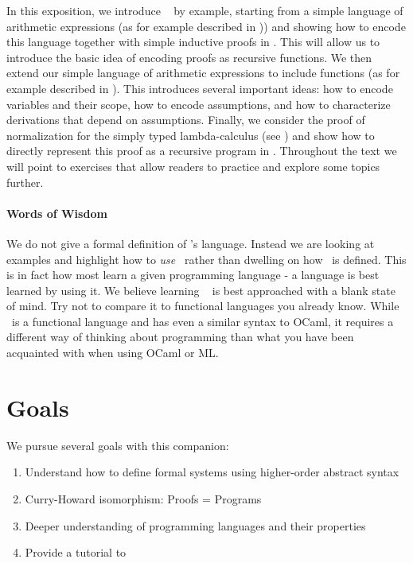 In this exposition, we introduce \beluga~ by example, starting from a simple language of arithmetic expressions (as for example described in \cite[Ch 3, Ch 8]{TAPL})) and showing how to encode this language together with simple inductive proofs  in \beluga. This will allow us to introduce the basic idea of encoding proofs as recursive functions. We then extend our simple language of arithmetic expressions to include functions (as for example described in \cite[Ch 5, Ch 9]{TAPL}). This introduces several important ideas: how to encode variables and their scope, how to encode assumptions, and how to characterize derivations that depend on assumptions. Finally, we consider the proof of normalization for the simply typed lambda-calculus (see \cite[Ch 12]{TAPL}) and show how to directly represent this proof as a recursive program in \beluga. Throughout the text we will point to exercises that allow readers to practice and explore some topics further.

\paragraph{Words of Wisdom}
We do not give a formal definition of \beluga's language.  Instead  we are looking at examples and highlight how to \emph{use} \beluga~rather than dwelling on how \beluga~is defined. This is in fact how most learn a given programming language - a language is best learned by using it. We believe learning \beluga~ is best approached with a blank state of mind. Try not to compare it to functional languages you already know. While \beluga~is a functional language and has even a similar syntax to OCaml,  it requires a different way of thinking about programming than what you have been acquainted with when using OCaml or ML.



\section{Goals}
We pursue several goals with this companion:

\begin{enumerate}
\item Understand how to define formal systems using higher-order abstract syntax  
\item Curry-Howard isomorphism: Proofs = Programs  
\item Deeper understanding of programming languages and their properties
\item Provide a tutorial to \beluga
\end{enumerate}



